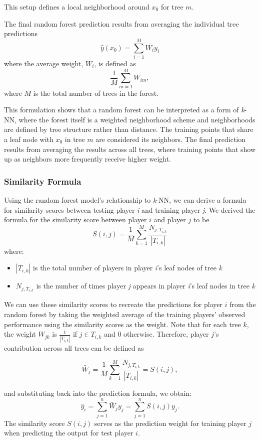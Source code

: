 \documentclass{article}
\begin{document}
This setup defines a local neighborhood around $x_0$ for tree $m$.

The final random forest prediction results from averaging the individual tree predictions $$\hat{y}(x_0)=\sum_{i=1}^M\bar{W_i}y_i$$
where the average weight, $\bar{W_i}$, is defined as $$\frac{1}{M}\sum_{m=1}^MW_{im},$$ where $M$ is the total number of trees in the forest.  

This formulation shows that a random forest can be interpreted as a form of \textit{k}-NN, where the forest itself is a weighted neighborhood scheme and neighborhoods are defined by tree structure rather than distance. The training points that share a leaf node with $x_0$ in tree $m$ are considered its neighbors. The final prediction results from averaging the results across all trees, where training points that show up as neighbors more frequently receive higher weight. 

\subsubsection{Similarity Formula}

Using the random forest model's relationship to \textit{k}-NN, we can derive a formula for similarity scores between testing player \textit{i} and training player \textit{j}. We derived the formula for the similarity score between player $i$ and player $j$ to be
$$S(i,j) = \frac{1}{M}\sum_{k=1}^{M}{\frac{N_{j,T_{i,k}}}{|T_{i,k}|}}$$
where:
\begin{itemize}
    \item $|T_{i,k}|$ is the total number of players in player \textit{i}'s leaf nodes of tree \textit{k} 
    \item $N_{j,T_{i,k}}$ is the number of times player \textit{j} appears in player \textit{i}'s leaf nodes in tree \textit{k}
\end{itemize}

We can use these similarity scores to recreate the predictions for player $i$ from the random forest by taking the weighted average of the training players' observed performance using the similarity scores as the weight.  Note that for each tree $k$, the weight $W_{jk}$ is $\frac{1}{|T_{i,k}|}$ if $j \in T_{i,k}$ and $0$ otherwise. Therefore, player $j$'s contribution across all trees can be defined as

$$\bar{W}_j = \frac{1}{M} \sum_{k=1}^M \frac{N_{j,T_{i,k}}}{|T_{i,k}|} = S(i,j),$$

and substituting back into the prediction formula, we obtain:
\[
\hat{y}_i = \sum_{j=1}^n \bar{W}_j y_j = \sum_{j=1}^n S(i,j) y_j.
\]
The similarity score $S(i,j)$ serves as the prediction weight for training player $j$ when predicting the output for test player $i$. 
\end{document}
